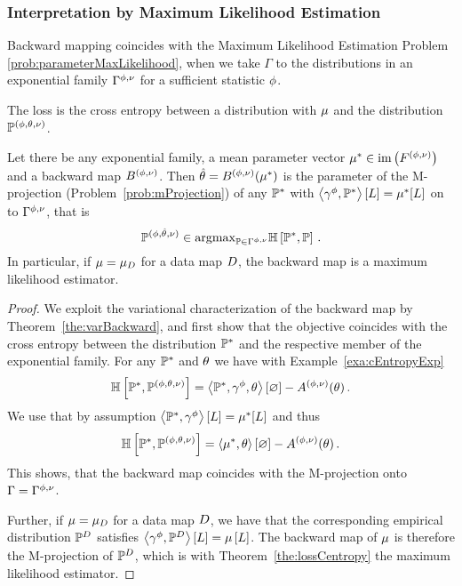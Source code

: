 \subsubsection{Interpretation by Maximum Likelihood Estimation}

Backward mapping coincides with the Maximum Likelihood Estimation Problem \eqref{prob:parameterMaxLikelihood}, when we take $\Gamma$ to the distributions in an exponential family $\Gamma^{\phi,\nu}$ for a sufficient statistic $\phi$.

The loss is the cross entropy between a distribution with $\mu$ and the distribution $\mathbb{P}^{(\phi,\theta,\nu)}$.


\begin{theorem}
	Let there be any exponential family, a mean parameter vector $\mu^*\in\mathrm{im}\left(F^{(\phi,\nu)}\right)$ and a backward map $B^{(\phi,\nu)}$.
	Then $\hat{\theta}=B^{(\phi,\nu)}(\mu^*)$ is the parameter of the M-projection (Problem~\ref{prob:mProjection}) of any $\mathbb{P}^*$ with $\left\langle \gamma^{\phi},\mathbb{P}^*\right\rangle \left[ L \right]=\mu^*[L]$ on to $\Gamma^{\phi,\nu}$, that is
		\[ \mathbb{P}^{(\phi,\hat{\theta},\nu)} \in \mathrm{argmax}_{\mathbb{P}\in\Gamma^{\phi,\nu}} \mathbb{H}\left[\mathbb{P}^*,\mathbb{P}\right]  \, . \]
	In particular, if $\mu=\mu_{D}$ for a data map $D$, the backward map is a maximum likelihood estimator.
\end{theorem}
\begin{proof}
	We exploit the variational characterization of the backward map by Theorem~\ref{the:varBackward}, and first show that the objective coincides with the cross entropy between the distribution $\mathbb{P}^*$ and the respective member of the exponential family.
	For any $\mathbb{P}^*$ and $\theta$ we have with Example~\ref{exa:cEntropyExp}
	\begin{align*}
		\mathbb{H}\left[\mathbb{P}^*,\mathbb{P}^{(\phi,\theta,\nu)}\right] 
		=   \left\langle \mathbb{P}^*,\gamma^{\phi},\theta\right\rangle \left[ \varnothing \right] -A^{(\phi,\nu)}(\theta) \, .  
	\end{align*}
	We use that by assumption $\left\langle \mathbb{P}^*,\gamma^{\phi}\right\rangle \left[ L \right]=\mu^*[L]$ and thus
	\begin{align*}
		\mathbb{H}\left[\mathbb{P}^*,\mathbb{P}^{(\phi,\theta,\nu)}\right] 
		=   \left\langle \mu^*,\theta\right\rangle \left[ \varnothing \right] -A^{(\phi,\nu)}(\theta) \, .  
	\end{align*}
	This shows, that the backward map coincides with the M-projection onto $\Gamma=\Gamma^{\phi,\nu}$.

	Further, if $\mu=\mu_{D}$ for a data map $D$, we have that the corresponding empirical distribution $\mathbb{P}^{D}$ satisfies $\left\langle \gamma^{\phi},\mathbb{P}^{D}\right\rangle \left[ L \right]=\mu\left[L\right]$.
	The backward map of $\mu$ is therefore the M-projection of $\mathbb{P}^{D}$, which is with Theorem~\ref{the:lossCentropy} the maximum likelihood estimator.
\end{proof}


